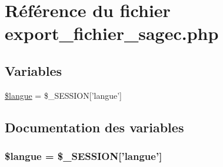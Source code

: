 \hypertarget{export__fichier__sagec_8php}{
\section{R\'{e}f\'{e}rence du fichier export\_\-fichier\_\-sagec.php}
\label{export__fichier__sagec_8php}
}
\subsection*{Variables}
\begin{CompactItemize}
\item 
\hyperlink{export__fichier__sagec_8php_a0}{\$langue} = \$\_\-SESSION\mbox{[}'langue'\mbox{]}
\end{CompactItemize}


\subsection{Documentation des variables}
\hypertarget{export__fichier__sagec_8php_a0}{
\subsubsection[\$langue]{\setlength{\rightskip}{0pt plus 5cm}\$langue = \$\_\-SESSION\mbox{[}'langue'\mbox{]}}}
\label{export__fichier__sagec_8php_a0}


